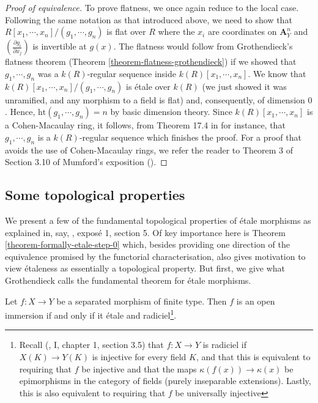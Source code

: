 \begin{proof}[Proof of equivalence]
\smallskip\noindent
To prove flatness, we once again reduce to the local case. Following the
same notation as that introduced above, we need to show that
$R[x_1,\cdots,x_n]/(g_1,\cdots,g_n)$ is flat over $R$ where the $x_i$ are
coordinates on $\mathbf{A}^n_Y$ and $(\frac{\partial g_i}{\partial x_j})$ is
invertible at $g(x)$. The flatness would follow from Grothendieck's flatness
theorem (Theorem \ref{theorem-flatness-grothendieck}) if we showed that
$g_1,\cdots,g_n$ was a $k(R)$-regular sequence inside
$k(R)[x_1,\cdots,x_n]$. We know that $k(R)[x_1,\cdots,x_n]/(g_1,\cdots,g_n)$
is \'etale over $k(R)$ (we just showed it was unramified, and any morphism to
a field is flat) and, consequently, of dimension $0$. Hence,
$\mathrm{ht}(g_1,\cdots,g_n) = n$ by basic dimension theory. Since
$k(R)[x_1,\cdots,x_n]$ is a Cohen-Macaulay ring, it follows, from Theorem
17.4 in \cite{Ma} for instance, that $g_1,\cdots,g_n$ is a $k(R)$-regular
sequence which finishes the proof. For a proof that avoids the use of
Cohen-Macaulay rings, we refer the reader to Theorem 3 of Section 3.10 of
Mumford's exposition (\cite{RB}).
\end{proof}

\subsection{Some topological properties }
\label{subsection-topological-etale}

\noindent
We present a few of the fundamental topological properties of \'etale
morphisms as explained in, say, \cite{SGA1}, expos\'e 1, section 5. Of key
importance here is Theorem \ref{theorem-formally-etale-step-0} which, besides
providing one direction of the equivalence promised by the functorial
characterisation, also gives motivation to view \'etaleness as essentially
a topological property. But first, we give what Grothendieck calls the
fundamental theorem for \'etale morphisms.

\begin{theorem}
\label{theorem-etale-radiciel-open}
Let $f:X \to Y$ be a separated morphism of finite type. Then $f$ is an open
immersion if and only if it \'etale and
radiciel\footnote{Recall (\cite{EGA}, I, chapter 1, section 3.5) that
$f:X \to Y$ is radiciel if $X(K) \to Y(K)$ is injective for every field $K$,
and that this is equivalent to requiring that $f$ be injective and that the
maps $\kappa(f(x)) \to \kappa(x)$ be epimorphisms in the category of fields
(purely inseparable extensions). Lastly, this is also equivalent to requiring
that $f$ be universally injective}.
\end{theorem}


